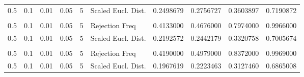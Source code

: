 \begin{table}
{{\begin{tabular}{rrrrrlrrrr}
\hspace{1em}\hspace{1em}0.5 & 0.1 & 0.01 & 0.05 & 5 & Scaled Eucl. Dist. & 0.2498679 & 0.2756727 & 0.3603897 & 0.7190872\\
\addlinespace[0.3em]
\multicolumn{10}{l}{\textbf{n = 400}}\\
\hspace{1em}\hspace{1em}0.5 & 0.1 & 0.01 & 0.05 & 5 & Rejection Freq & 0.4133000 & 0.4676000 & 0.7974000 & 0.9966000\\
\hspace{1em}\hspace{1em}0.5 & 0.1 & 0.01 & 0.05 & 5 & Scaled Eucl. Dist. & 0.2192572 & 0.2442179 & 0.3320758 & 0.7005674\\
\addlinespace[0.3em]
\multicolumn{10}{l}{\textbf{n = 500}}\\
\hspace{1em}\hspace{1em}0.5 & 0.1 & 0.01 & 0.05 & 5 & Rejection Freq & 0.4190000 & 0.4979000 & 0.8372000 & 0.9969000\\
\hspace{1em}\hspace{1em}0.5 & 0.1 & 0.01 & 0.05 & 5 & Scaled Eucl. Dist. & 0.1967619 & 0.2223463 & 0.3127460 & 0.6865008\\
\bottomrule
\end{tabular}
}}
 \end{table}
